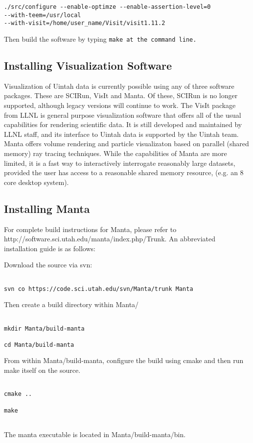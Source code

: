 \begin{Verbatim}[fontsize=\footnotesize]
./src/configure --enable-optimze --enable-assertion-level=0 
--with-teem=/usr/local
--with-visit=/home/user_name/Visit/visit1.11.2
\end{Verbatim}

Then build the software by typing \tt make \normalfont at the command line.

\subsection{Installing Visualization Software}

Visualization of Uintah data is currently possible using any of three
software packages.  These are SCIRun, VisIt and Manta.  Of these, SCIRun is
no longer supported, although legacy versions will continue to work.  The
VisIt package from LLNL is general purpose visualization software that offers
all of the usual capabilities for rendering scientific data.  It is still
developed and maintained by LLNL staff, and its interface to Uintah data is
supported by the Uintah team.  Manta offers volume rendering and particle
visualizaton based on parallel (shared memory) ray tracing techniques.
While the capabilities of Manta are more limited, it is a fast way to
interactively interrogate reasonably large datasets, provided the user has
access to a reasonable shared memory resource, (e.g. an 8 core desktop system).

\subsection{Installing Manta}

For complete build instructions for Manta, please refer to
http://software.sci.utah.edu/manta/index.php/Trunk.  An abbreviated
installation guide is as follows:

Download the source via svn:

\begin{Verbatim}

svn co https://code.sci.utah.edu/svn/Manta/trunk Manta

\end{Verbatim}

Then create a build directory within Manta/

\begin{Verbatim}

mkdir Manta/build-manta

cd Manta/build-manta

\end{Verbatim}

From  within Manta/build-manta,  configure the  build using  cmake and
then run  make itself on the  source.

\begin{Verbatim}

cmake ..

make


\end{Verbatim}

The manta executable is located in Manta/build-manta/bin.

